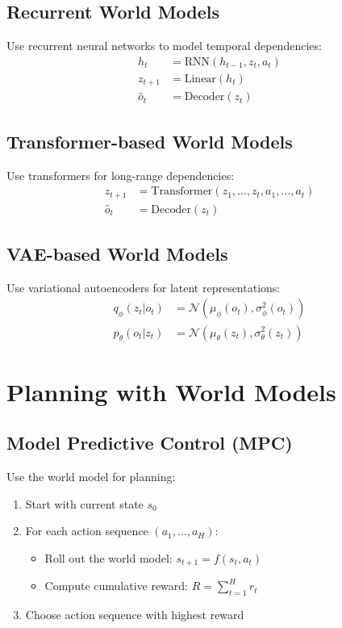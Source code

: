 \subsection{Recurrent World Models}

Use recurrent neural networks to model temporal dependencies:
\begin{align}
    h_t &= \text{RNN}(h_{t-1}, z_t, a_t) \\
    z_{t+1} &= \text{Linear}(h_t) \\
    \hat{o}_t &= \text{Decoder}(z_t)
\end{align}

\subsection{Transformer-based World Models}

Use transformers for long-range dependencies:
\begin{align}
    z_{t+1} &= \text{Transformer}(z_1, \ldots, z_t, a_1, \ldots, a_t) \\
    \hat{o}_t &= \text{Decoder}(z_t)
\end{align}

\subsection{VAE-based World Models}

Use variational autoencoders for latent representations:
\begin{align}
    q_\phi(z_t | o_t) &= \mathcal{N}(\mu_\phi(o_t), \sigma_\phi^2(o_t)) \\
    p_\theta(o_t | z_t) &= \mathcal{N}(\mu_\theta(z_t), \sigma_\theta^2(z_t))
\end{align}

\section{Planning with World Models}

\subsection{Model Predictive Control (MPC)}

Use the world model for planning:
\begin{enumerate}
    \item Start with current state $s_0$
    \item For each action sequence $(a_1, \ldots, a_H)$:
    \begin{itemize}
        \item Roll out the world model: $s_{t+1} = f(s_t, a_t)$
        \item Compute cumulative reward: $R = \sum_{t=1}^H r_t$
    \end{itemize}
    \item Choose action sequence with highest reward
\end{enumerate}

